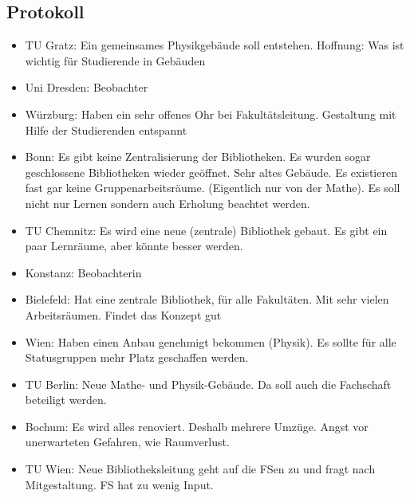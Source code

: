   \subsection*{Protokoll}
      \begin{itemize}
        \item TU Gratz: Ein gemeinsames Physikgebäude soll entstehen. Hoffnung: Was ist wichtig für Studierende in Gebäuden

        \item Uni Dresden: Beobachter

        \item Würzburg: Haben ein sehr offenes Ohr bei Fakultätsleitung. Gestaltung mit Hilfe der Studierenden entspannt

        \item Bonn: Es gibt keine Zentralisierung der Bibliotheken. Es wurden sogar geschlossene Bibliotheken wieder geöffnet. Sehr altes Gebäude.
        Es existieren fast gar keine Gruppenarbeitsräume. (Eigentlich nur von der Mathe). Es soll nicht nur Lernen sondern auch Erholung beachtet werden.

        \item TU Chemnitz: Es wird eine neue (zentrale) Bibliothek gebaut. Es gibt ein paar Lernräume, aber könnte besser werden.

        \item Konstanz: Beobachterin

        \item Bielefeld: Hat eine zentrale Bibliothek, für alle Fakultäten. Mit sehr vielen Arbeitsräumen. Findet das Konzept gut

        \item Wien: Haben einen Anbau genehmigt bekommen (Physik). Es sollte für alle Statusgruppen mehr Platz geschaffen werden.

        \item TU Berlin: Neue Mathe- und Physik-Gebäude. Da soll auch die Fachschaft beteiligt werden.

        \item Bochum: Es wird alles renoviert. Deshalb mehrere Umzüge. Angst vor unerwarteten Gefahren, wie Raumverlust.

        \item TU Wien: Neue Bibliotheksleitung geht auf die FSen zu und fragt nach Mitgestaltung. FS hat zu wenig Input.
      \end{itemize} \\


